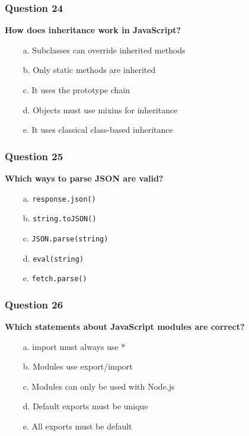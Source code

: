 \documentclass{article}
\newcommand{\cmark}{\textcolor{green}{\ding{51}}} %
\newcommand{\xmark}{\textcolor{red}{\ding{55}}}   %
\begin{document}
\subsubsection*{Question 24}
\textbf{How does inheritance work in JavaScript?}

\begin{itemize}
  \item[\cmark\ a.] Subclasses can override inherited methods
  \item[\xmark\ b.] Only static methods are inherited
  \item[\cmark\ c.] It uses the prototype chain
  \item[\xmark\ d.] Objects must use mixins for inheritance
  \item[\xmark\ e.] It uses classical class-based inheritance
\end{itemize}

\subsubsection*{Question 25}
\textbf{Which ways to parse JSON are valid?}

\begin{itemize}
  \item[\cmark\ a.] \texttt{response.json()}
  \item[\xmark\ b.] \texttt{string.toJSON()}
  \item[\cmark\ c.] \texttt{JSON.parse(string)}
  \item[\xmark\ d.] \texttt{eval(string)}
  \item[\xmark\ e.] \texttt{fetch.parse()}
\end{itemize}

\subsubsection*{Question 26}
\textbf{Which statements about JavaScript modules are correct?}

\begin{itemize}
  \item[\xmark\ a.] import must always use *
  \item[\cmark\ b.] Modules use export/import
  \item[\xmark\ c.] Modules can only be used with Node.js
  \item[\cmark\ d.] Default exports must be unique
  \item[\xmark\ e.] All exports must be default
\end{itemize}
\end{document}
